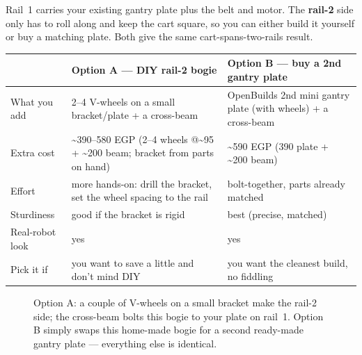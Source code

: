 \documentclass[11pt,a4paper]{article}
\begin{document}
Rail~1 carries your existing gantry plate plus the belt and motor. The \textbf{rail-2} side only has to
roll along and keep the cart square, so you can either build it yourself or buy a matching plate. Both
give the same cart-spans-two-rails result.

\begin{center}\small
\begin{tabular}{@{}p{2.6cm}p{5.7cm}p{5.7cm}@{}}
\toprule
 & \textbf{Option A --- DIY rail-2 bogie} & \textbf{Option B --- buy a 2nd gantry plate} \\
\midrule
What you add & 2--4 V-wheels on a small bracket/plate + a cross-beam & OpenBuilds 2nd mini gantry plate (with wheels) + a cross-beam \\
Extra cost & \textasciitilde 390--580 EGP (2--4 wheels @\textasciitilde 95 + \textasciitilde 200 beam; bracket from parts on hand) & \textasciitilde 590 EGP (390 plate + \textasciitilde 200 beam) \\
Effort & more hands-on: drill the bracket, set the wheel spacing to the rail & bolt-together, parts already matched \\
Sturdiness & good if the bracket is rigid & best (precise, matched) \\
Real-robot look & yes & yes \\
Pick it if & you want to save a little and don't mind DIY & you want the cleanest build, no fiddling \\
\bottomrule
\end{tabular}
\end{center}

\begin{figure}[h]
\centering
{}
\caption{Option A: a couple of V-wheels on a small bracket make the rail-2 side; the cross-beam bolts this
bogie to your plate on rail~1. Option B simply swaps this home-made bogie for a second ready-made gantry
plate --- everything else is identical.}
\end{figure}
\end{document}
